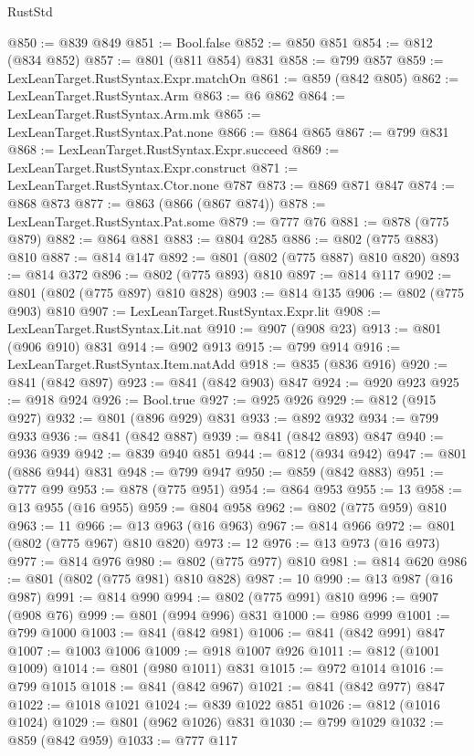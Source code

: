 \begin{lexlean}{RustStd}
\begin{coremodule}
@850 := @839 @849
@851 := Bool.false
@852 := @850 @851
@854 := @812 (@834 @852)
@857 := @801 (@811 @854) @831
@858 := @799 @857
@859 := LexLeanTarget.RustSyntax.Expr.matchOn
@861 := @859 (@842 @805)
@862 := LexLeanTarget.RustSyntax.Arm
@863 := @6 @862
@864 := LexLeanTarget.RustSyntax.Arm.mk
@865 := LexLeanTarget.RustSyntax.Pat.none
@866 := @864 @865
@867 := @799 @831
@868 := LexLeanTarget.RustSyntax.Expr.succeed
@869 := LexLeanTarget.RustSyntax.Expr.construct
@871 := LexLeanTarget.RustSyntax.Ctor.none @787
@873 := @869 @871 @847
@874 := @868 @873
@877 := @863 (@866 (@867 @874))
@878 := LexLeanTarget.RustSyntax.Pat.some
@879 := @777 @76
@881 := @878 (@775 @879)
@882 := @864 @881
@883 := @804 @285
@886 := @802 (@775 @883) @810
@887 := @814 @147
@892 := @801 (@802 (@775 @887) @810 @820)
@893 := @814 @372
@896 := @802 (@775 @893) @810
@897 := @814 @117
@902 := @801 (@802 (@775 @897) @810 @828)
@903 := @814 @135
@906 := @802 (@775 @903) @810
@907 := LexLeanTarget.RustSyntax.Expr.lit
@908 := LexLeanTarget.RustSyntax.Lit.nat
@910 := @907 (@908 @23)
@913 := @801 (@906 @910) @831
@914 := @902 @913
@915 := @799 @914
@916 := LexLeanTarget.RustSyntax.Item.natAdd
@918 := @835 (@836 @916)
@920 := @841 (@842 @897)
@923 := @841 (@842 @903) @847
@924 := @920 @923
@925 := @918 @924
@926 := Bool.true
@927 := @925 @926
@929 := @812 (@915 @927)
@932 := @801 (@896 @929) @831
@933 := @892 @932
@934 := @799 @933
@936 := @841 (@842 @887)
@939 := @841 (@842 @893) @847
@940 := @936 @939
@942 := @839 @940 @851
@944 := @812 (@934 @942)
@947 := @801 (@886 @944) @831
@948 := @799 @947
@950 := @859 (@842 @883)
@951 := @777 @99
@953 := @878 (@775 @951)
@954 := @864 @953
@955 := 13
@958 := @13 @955 (@16 @955)
@959 := @804 @958
@962 := @802 (@775 @959) @810
@963 := 11
@966 := @13 @963 (@16 @963)
@967 := @814 @966
@972 := @801 (@802 (@775 @967) @810 @820)
@973 := 12
@976 := @13 @973 (@16 @973)
@977 := @814 @976
@980 := @802 (@775 @977) @810
@981 := @814 @620
@986 := @801 (@802 (@775 @981) @810 @828)
@987 := 10
@990 := @13 @987 (@16 @987)
@991 := @814 @990
@994 := @802 (@775 @991) @810
@996 := @907 (@908 @76)
@999 := @801 (@994 @996) @831
@1000 := @986 @999
@1001 := @799 @1000
@1003 := @841 (@842 @981)
@1006 := @841 (@842 @991) @847
@1007 := @1003 @1006
@1009 := @918 @1007 @926
@1011 := @812 (@1001 @1009)
@1014 := @801 (@980 @1011) @831
@1015 := @972 @1014
@1016 := @799 @1015
@1018 := @841 (@842 @967)
@1021 := @841 (@842 @977) @847
@1022 := @1018 @1021
@1024 := @839 @1022 @851
@1026 := @812 (@1016 @1024)
@1029 := @801 (@962 @1026) @831
@1030 := @799 @1029
@1032 := @859 (@842 @959)
@1033 := @777 @117

\end{coremodule}
\end{lexlean}
